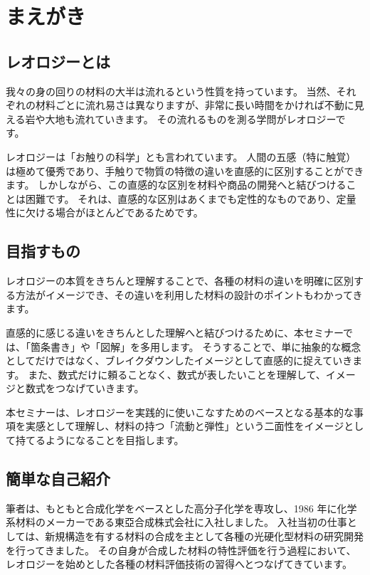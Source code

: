 \chapter*{まえがき}

\section*{レオロジーとは}
我々の身の回りの材料の大半は流れるという性質を持っています。
当然、それぞれの材料ごとに流れ易さは異なりますが、非常に長い時間をかければ不動に見える岩や大地も流れていきます。
その流れるものを測る学問がレオロジーです。

レオロジーは「お触りの科学」とも言われています。
人間の五感（特に触覚）は極めて優秀であり、手触りで物質の特徴の違いを直感的に区別することができます。
しかしながら、この直感的な区別を材料や商品の開発へと結びつけることは困難です。
それは、直感的な区別はあくまでも定性的なものであり、定量性に欠ける場合がほとんどであるためです。

\section*{目指すもの}
レオロジーの本質をきちんと理解することで、各種の材料の違いを明確に区別する方法がイメージでき、その違いを利用した材料の設計のポイントもわかってきます。

直感的に感じる違いをきちんとした理解へと結びつけるために、本セミナーでは、「箇条書き」や「図解」を多用します。
そうすることで、単に抽象的な概念としてだけではなく、ブレイクダウンしたイメージとして直感的に捉えていきます。
また、数式だけに頼ることなく、数式が表したいことを理解して、イメージと数式をつなげていきます。

本セミナーは、レオロジーを実践的に使いこなすためのベースとなる基本的な事項を実感として理解し、材料の持つ「流動と弾性」という二面性をイメージとして持てるようになることを目指します。

\section*{簡単な自己紹介}

筆者は、もともと合成化学をベースとした高分子化学を専攻し、1986 年に化学系材料のメーカーである東亞合成株式会社に入社しました。
入社当初の仕事としては、新規構造を有する材料の合成を主として各種の光硬化型材料の研究開発を行ってきました。
その自身が合成した材料の特性評価を行う過程において、レオロジーを始めとした各種の材料評価技術の習得へとつなげてきています。

